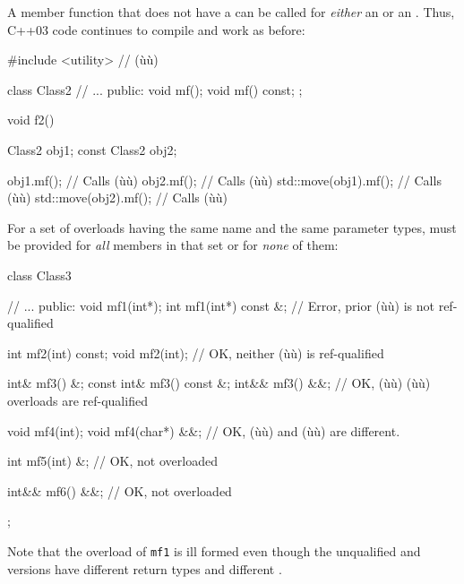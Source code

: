 \noindent A member function that does not have a  can be
called for \emph{either} an  or an . Thus,
C++03 code continues to compile and work as before:

\begin{emcppslisting}[emcppsbatch=e2]
#include <utility>  // (ù{}ù)

class Class2
{
    // ...
public:
    void mf();
    void mf() const;
};

void f2()
{
    Class2       obj1;
    const Class2 obj2;

    obj1.mf();             // Calls (ù{}ù)
    obj2.mf();             // Calls (ù{}ù)
    std::move(obj1).mf();  // Calls (ù{}ù)
    std::move(obj2).mf();  // Calls (ù{}ù)
}
\end{emcppslisting}
    

\noindent For a set of overloads having the same name and the same parameter
types,  must be provided for \emph{all} members
in that set or for \emph{none} of them:

\begin{emcppslisting}[emcppsbatch=e2]
class Class3
{
    // ...
public:
    void mf1(int*);
    int  mf1(int*) const &;  // Error, prior (ù{}ù) is not ref-qualified

    int  mf2(int) const;
    void mf2(int);           // OK, neither (ù{}ù) is ref-qualified

    int&        mf3() &;
    const int&  mf3() const &;
    int&&       mf3() &&;    // OK, (ù{}ù) (ù{}ù) overloads are ref-qualified

    void mf4(int);
    void mf4(char*) &&;      // OK, (ù{}ù) and (ù{}ù) are different.

    int mf5(int) &;          // OK, not overloaded

    int&& mf6() &&;          // OK, not overloaded
};
\end{emcppslisting}
    

\noindent Note that the overload of \lstinline!mf1! is ill formed even though the
unqualified and  versions have different return
types and different .


